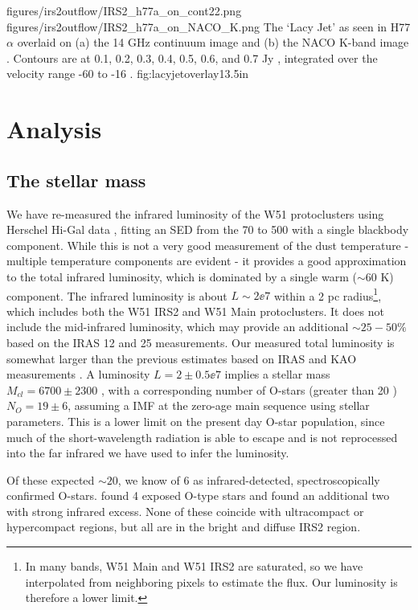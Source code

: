 \FigureTwo
{figures/irs2outflow/IRS2_h77a_on_cont22.png} %
{figures/irs2outflow/IRS2_h77a_on_NACO_K.png} %
{The `Lacy Jet' as seen in H77$\alpha$ overlaid on (a) the 14 GHz continuum
image and (b) the NACO K-band image \citep{Barbosa2008a}.  Contours are at 
0.1, 0.2, 0.3, 0.4, 0.5, 0.6, and 0.7 Jy \kms, integrated over the velocity
range -60 to -16 \kms.}
{fig:lacyjetoverlay}{1}{3.5in}

\section{Analysis}
\label{sec:analysis}
\subsection{The stellar mass}
\label{sec:stellarmass}

We have re-measured the infrared luminosity of the W51 protoclusters using Herschel
Hi-Gal data \citep{Molinari2010a,Traficante2011a}, fitting an SED from the 70
to 500 \um with a single blackbody component.
While this is not a very good
measurement of the dust temperature - multiple temperature components are
evident \citep{Sievers1991a} - it provides a good approximation to the total
infrared luminosity, which is dominated by a single warm ($\sim60$ K)
component.  The infrared luminosity is about $L\sim2\ee{7}$ \lsun within a 2 pc
radius\footnote{In many bands, W51 Main and W51 IRS2 are
saturated, so we have interpolated from neighboring pixels to estimate the flux.
Our luminosity is therefore a lower limit.}, which includes
both the W51 IRS2 and W51 Main protoclusters.  It does not include the
mid-infrared luminosity, which may provide an additional $\sim25-50\%$ based on
the IRAS 12 and 25 \um measurements.  Our measured total luminosity is somewhat
larger than the previous estimates based on IRAS and KAO measurements
\citep{Harvey1986a,Sievers1991a}.  A luminosity $L=2\pm0.5\ee{7}$ \lsun implies
a stellar mass $M_{cl} = 6700 \pm 2300$ \msun, with a corresponding number of
O-stars (greater than 20 \msun) $N_O = 19 \pm 6$, assuming a
\citet{Kroupa2001a} IMF at the zero-age main sequence using \citet{Vacca1996a}
stellar parameters.  This is a lower limit on the present day O-star population,
since much of the short-wavelength radiation is able to escape and is not
reprocessed into the far infrared we have used to infer the luminosity.

Of these expected $\sim20$, we know of 6 as infrared-detected, spectroscopically
confirmed O-stars.  \citet{Figueredo2008a} found 4 exposed O-type stars and
\citet{Barbosa2008a} found an additional two with strong infrared excess.  None
of these coincide with ultracompact or hypercompact \hii regions, but all are
in the bright and diffuse IRS2 region.

